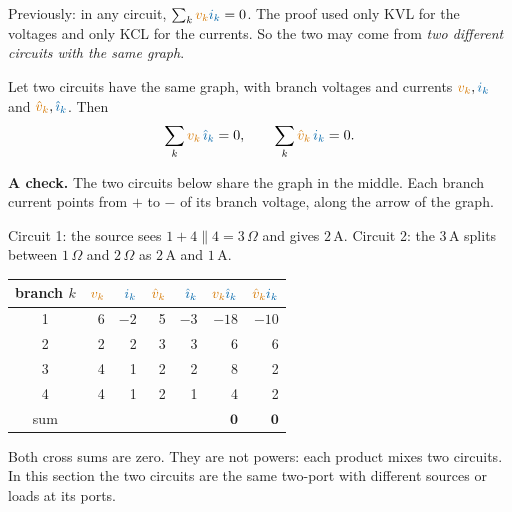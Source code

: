 \documentclass[11pt,a4paper]{article}
\newcommand{\Icol}[1]{\textcolor{ccur}{#1}}
\newcommand{\Vcol}[1]{\textcolor{cvolt}{#1}}
\newcommand{\uni}[1]{\,\mathrm{#1}}
\newcommand{\A}{\uni{A}}   \newcommand{\V}{\uni{V}}
\newcommand{\ohm}{\,\Omega}
\newcommand{\tgCirc}[1]{%
  \ifcase#1
    \draw (0,2) to[american voltage source, l_=$\Vcol{6\V}$] (0,0);
    \draw (0,2) to[R, l=$1\ohm$] (2,2) -- (3.4,2);
    \draw (2,2) to[R, l_=$4\ohm$] (2,0); \draw (3.4,2) to[R, l=$4\ohm$] (3.4,0);
  \or
    \draw (0,0) to[american current source, l=$\Icol{3\A}$] (0,2);
    \draw (0,2) to[R, l=$1\ohm$] (2,2) -- (3.4,2);
    \draw (2,2) to[R, l_=$1\ohm$] (2,0); \draw (3.4,2) to[R, l=$2\ohm$] (3.4,0);
  \fi
  \draw (0,0) -- (3.4,0);
  \fill (2,2) circle (1.6pt); \fill (2,0) circle (1.6pt);
  \node[btag] at (0,-0.45) {1}; \node[btag] at (0.75,1.5) {2};
  \node[btag] at (2,-0.45) {3};  \node[btag] at (3.4,-0.45) {4};}
\newcommand{\tgGraph}{%
  \coordinate (n1) at (0,2); \coordinate (n2) at (2.2,2); \coordinate (n0) at (1.1,0);
  \draw[-{Stealth[length=2mm]}, thick] (n1) -- node[btag, left=3pt] {1} (n0);
  \draw[-{Stealth[length=2mm]}, thick] (n1) -- node[btag, above=3pt] {2} (n2);
  \draw[-{Stealth[length=2mm]}, thick] (n2) to[bend right=25] node[btag, left=2pt] {3} (n0);
  \draw[-{Stealth[length=2mm]}, thick] (n2) to[bend left=25] node[btag, right=2pt] {4} (n0);
  \foreach \n/\t/\a in {n1/1/above left, n2/2/above right, n0/0/below} {\fill (\n) circle (2.2pt); \node[\a, font=\small] at (\n) {\t};}}
\begin{document}
Previously: in any circuit, $\sum_k \Vcol{v_k}\Icol{i_k} = 0$. The proof used only KVL for the
voltages and only KCL for the currents. So the two may come from \emph{two different
circuits with the same graph}.

\begin{ideabox}
Let two circuits have the same graph, with branch voltages and currents $\Vcol{v_k}, \Icol{i_k}$
and $\Vcol{\hat v_k}, \Icol{\hat\imath_k}$. Then
\[
  \sum_k \Vcol{v_k}\,\Icol{\hat\imath_k} = 0, \qquad \sum_k \Vcol{\hat v_k}\,\Icol{i_k} = 0 .
\]
\end{ideabox}

\textbf{A check.} The two circuits below share the graph in the middle. Each branch current
points from $+$ to $-$ of its branch voltage, along the arrow of the graph.
\begin{center}
\end{center}
Circuit 1: the source sees $1 + 4 \parallel 4 = 3\ohm$ and gives $2\A$. Circuit 2: the $3\A$ splits
between $1\ohm$ and $2\ohm$ as $2\A$ and $1\A$.
\begin{center}
\renewcommand{\arraystretch}{1.25}
\begin{tabular}{@{}c|rr|rr|rr@{}}
\toprule
branch $k$ & $\Vcol{v_k}$ & $\Icol{i_k}$ & $\Vcol{\hat v_k}$ & $\Icol{\hat\imath_k}$ & $\Vcol{v_k}\Icol{\hat\imath_k}$ & $\Vcol{\hat v_k}\Icol{i_k}$\\
\midrule
1 & 6 & $-2$ & 5 & $-3$ & $-18$ & $-10$\\
2 & 2 & 2 & 3 & 3 & 6 & 6\\
3 & 4 & 1 & 2 & 2 & 8 & 2\\
4 & 4 & 1 & 2 & 1 & 4 & 2\\
\midrule
sum & & & & & $\mathbf{0}$ & $\mathbf{0}$\\
\bottomrule
\end{tabular}
\end{center}
Both cross sums are zero. They are not powers: each product mixes two circuits. In this
section the two circuits are the same two-port with different sources or loads at its ports.
\end{document}
